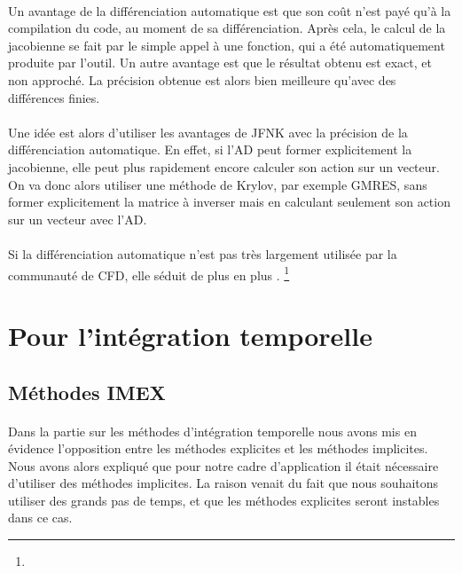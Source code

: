    \paragraph{}
    Un avantage de la différenciation automatique est que son coût n'est payé qu'à la compilation du code, au moment de sa différenciation.
    Après cela, le calcul de la jacobienne se fait par le simple appel à une fonction, qui a été automatiquement produite par l'outil.
    Un autre avantage est que le résultat obtenu est exact, et non approché.
    La précision obtenue est alors bien meilleure qu'avec des différences finies.

    \paragraph{}
    Une idée est alors d'utiliser les avantages de JFNK avec la précision de la différenciation automatique.
    En effet, si l'AD peut former explicitement la jacobienne, elle peut plus rapidement encore calculer son action sur un vecteur.
    On va donc alors utiliser une méthode de Krylov, par exemple GMRES, sans former explicitement la matrice à inverser mais en calculant seulement son action sur un vecteur avec l'AD.

    \paragraph{}
    Si la différenciation automatique n'est pas très largement utilisée par la communauté de CFD, elle séduit de plus en plus \cite{BilanceriBeuxElmahiEtAl2011, KenwayMaderHeEtAl2019}.
    \footnote{}


\section{Pour l'intégration temporelle}

  \subsection{Méthodes IMEX}

    \paragraph{}
    Dans la partie sur les méthodes d’intégration temporelle nous avons mis en évidence l'opposition entre les méthodes explicites et les méthodes implicites.
    Nous avons alors expliqué que pour notre cadre d'application il était nécessaire d'utiliser des méthodes implicites.
    La raison venait du fait que nous souhaitons utiliser des grands pas de temps, et que les méthodes explicites seront instables dans ce cas.

